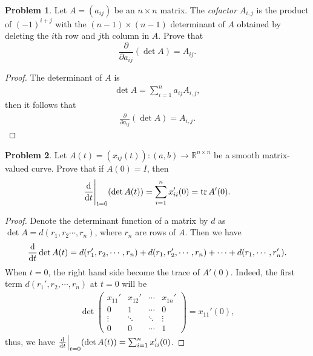 \documentclass[11pt]{article}
\theoremstyle{definition}
\newtheorem{problem}{Problem}
\theoremstyle{definition}
\begin{document}
\medskip

\begin{problem}\label{problem_46}
Let $A=\left(a_{ij}\right)$ be an $n\times n$ matrix. The {\em cofactor} $A_{i,j}$ is the product of $(-1)^{i+j}$ with the $(n-1)\times(n-1)$ determinant of $A$ obtained by deleting the $i$th row and $j$th column in $A$. Prove that
$$
\frac{\partial}{\partial a_{ij}}(\det A)=A_{ij}.
$$
\end{problem}
\begin{proof}
The determinant of $A$ is 
\begin{align*}
    \det A = \sum^n_{i=1} a_{ij} A_{i,j},
\end{align*}
then it follows that
\begin{align*}
    \frac{\partial}{\partial a_{ij}}(\det A)=A_{i,j}.
\end{align*}
\end{proof}

\medskip

\begin{problem}\label{problem_47}
Let $A(t)=\left(x_{ij}(t)\right):(a,b)\to\mathbb{R}^{n\times n}$ be a smooth matrix-valued curve. Prove that if $A(0)=I$, then
$$
\dv{}{t}\Bigg|_{t=0}(\det A(t))=\sum_{i=1}^n x_{ii}'(0)={\rm tr}\, A'(0).
$$
\end{problem}
\begin{proof}
Denote the determinant function of a matrix by $d$ as $\det A = d(r_1, r_2 \cdots, r_n)$, where $r_n$ are rows of $A$. Then we have
\begin{align*}
    \dv{}{t} \det A(t) = d(r_1',r_2,\cdots,r_n) + d(r_1,r_2',\cdots,r_n) + \cdots + d(r_1,\cdots,r_n').
\end{align*}
When $t = 0$, the right hand side become the trace of $A'(0)$. Indeed, the first term $d(r_1',r_2,\cdots,r_n)$ at $t = 0$ will be
\begin{align*}
    \det \begin{pmatrix}
        x_{11}' & x_{12}' & \cdots & x_{1n}' \\
        0       & 1       & \cdots & 0 \\
        \vdots  & \ddots  & \ddots & \vdots \\
        0       & 0       & \cdots & 1
    \end{pmatrix} = x_{11}'(0),
\end{align*}
thus, we have $\dv{}{t}\Big|_{t=0}(\det A(t))=\sum_{i=1}^n x_{ii}'(0)$.
\end{proof}

\medskip
\end{document}
